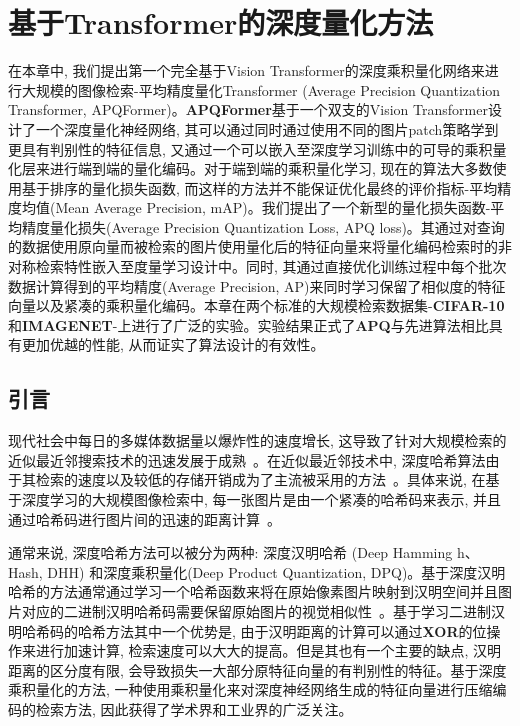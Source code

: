 \chapter{基于Transformer的深度量化方法}
在本章中, 我们提出第一个完全基于Vision Transformer的深度乘积量化网络来进行大规模的图像检索-平均精度量化Transformer (Average Precision Quantization Transformer, APQFormer)。\textbf{APQFormer}基于一个双支的Vision Transformer设计了一个深度量化神经网络, 其可以通过同时通过使用不同的图片patch策略学到更具有判别性的特征信息, 又通过一个可以嵌入至深度学习训练中的可导的乘积量化层来进行端到端的量化编码。对于端到端的乘积量化学习, 现在的算法大多数使用基于排序的量化损失函数, 而这样的方法并不能保证优化最终的评价指标-平均精度均值(Mean Average Precision, mAP)。我们提出了一个新型的量化损失函数-平均精度量化损失(Average Precision Quantization Loss, APQ loss)。其通过对查询的数据使用原向量而被检索的图片使用量化后的特征向量来将量化编码检索时的非对称检索特性嵌入至度量学习设计中。同时, 其通过直接优化训练过程中每个批次数据计算得到的平均精度(Average Precision, AP)来同时学习保留了相似度的特征向量以及紧凑的乘积量化编码。本章在两个标准的大规模检索数据集-\textbf{CIFAR-10}和\textbf{IMAGENET}-上进行了广泛的实验。实验结果正式了\textbf{APQ}与先进算法相比具有更加优越的性能, 从而证实了算法设计的有效性。
\section{引言}
现代社会中每日的多媒体数据量以爆炸性的速度增长, 这导致了针对大规模检索的近似最近邻搜索技术的迅速发展于成熟~\cite{andoni2006near,shrivastava2014densifying, malkov2018efficient, nie2020deep, li2021dahp}。在近似最近邻技术中, 深度哈希算法由于其检索的速度以及较低的存储开销成为了主流被采用的方法~\cite{zhu2016deep, jiang2018asymmetric, zhang2019improved, cao2017hashnet}。具体来说, 在基于深度学习的大规模图像检索中, 每一张图片是由一个紧凑的哈希码来表示, 并且通过哈希码进行图片间的迅速的距离计算~\cite{jang2020generalized}。\par
通常来说, 深度哈希方法可以被分为两种: 深度汉明哈希 (Deep Hamming h、Hash, DHH) 和深度乘积量化(Deep Product Quantization, DPQ)。基于深度汉明哈希的方法通常通过学习一个哈希函数来将在原始像素图片映射到汉明空间并且图片对应的二进制汉明哈希码需要保留原始图片的视觉相似性~\cite{zhu2016deep,zhang2019improved, cao2017hashnet, cao2018deep, fan2020deep}。基于学习二进制汉明哈希码的哈希方法其中一个优势是, 由于汉明距离的计算可以通过\textbf{XOR}的位操作来进行加速计算, 检索速度可以大大的提高。但是其也有一个主要的缺点, 汉明距离的区分度有限, 会导致损失一大部分原特征向量的有判别性的特征。基于深度乘积量化的方法, 一种使用乘积量化来对深度神经网络生成的特征向量进行压缩编码的检索方法, 因此获得了学术界和工业界的广泛关注。\par

